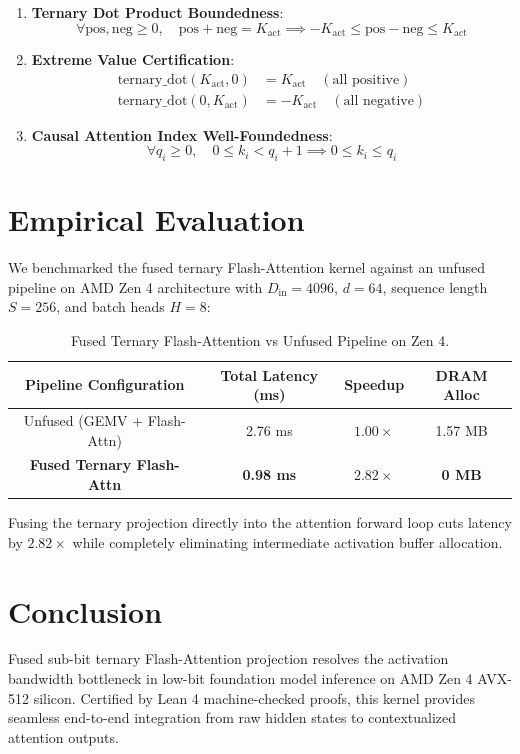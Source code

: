 \documentclass[10pt,twocolumn,letterpaper]{article}
\begin{document}
\begin{enumerate}
    \item \textbf{Ternary Dot Product Boundedness}:
    \begin{equation}
    \forall \text{pos}, \text{neg} \ge 0, \quad \text{pos} + \text{neg} = K_{\text{act}} \implies -K_{\text{act}} \le \text{pos} - \text{neg} \le K_{\text{act}}
    \end{equation}
    \item \textbf{Extreme Value Certification}:
    \begin{align}
    \text{ternary\_dot}(K_{\text{act}}, 0) &= K_{\text{act}} \quad (\text{all positive}) \\
    \text{ternary\_dot}(0, K_{\text{act}}) &= -K_{\text{act}} \quad (\text{all negative})
    \end{align}
    \item \textbf{Causal Attention Index Well-Foundedness}:
    \begin{equation}
    \forall q_i \ge 0, \quad 0 \le k_i < q_i + 1 \implies 0 \le k_i \le q_i
    \end{equation}
\end{enumerate}

\section{Empirical Evaluation}

We benchmarked the fused ternary Flash-Attention kernel against an unfused pipeline on AMD Zen 4 architecture with $D_{\text{in}} = 4096$, $d = 64$, sequence length $S = 256$, and batch heads $H = 8$:

\begin{table}[h]
\centering
\caption{Fused Ternary Flash-Attention vs Unfused Pipeline on Zen 4.}
\small
\begin{tabular}{@{}cccc@{}}
\toprule
Pipeline Configuration & Total Latency (ms) & Speedup & DRAM Alloc \\
\midrule
Unfused (GEMV + Flash-Attn) & 2.76 ms & $1.00\times$ & 1.57 MB \\
\textbf{Fused Ternary Flash-Attn} & \textbf{0.98 ms} & $\mathbf{2.82\times}$ & \textbf{0 MB} \\
\bottomrule
\end{tabular}
\end{table}

Fusing the ternary projection directly into the attention forward loop cuts latency by $2.82\times$ while completely eliminating intermediate activation buffer allocation.

\section{Conclusion}

Fused sub-bit ternary Flash-Attention projection resolves the activation bandwidth bottleneck in low-bit foundation model inference on AMD Zen 4 AVX-512 silicon. Certified by Lean 4 machine-checked proofs, this kernel provides seamless end-to-end integration from raw hidden states to contextualized attention outputs.
\end{document}
